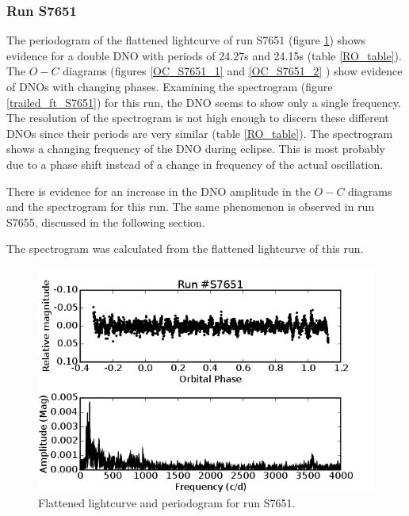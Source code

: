 \subsubsection{Run S7651}

The periodogram of the flattened lightcurve of run S7651 (figure \ref{S7651}) shows evidence for a double DNO with periods of 24.27s and 24.15s (table \ref{RO_table}). The $O-C$ diagrams (figures \ref{OC_S7651_1} and \ref{OC_S7651_2} ) show evidence of DNOs with changing phases. Examining the spectrogram (figure \ref{trailed_ft_S7651}) for this run, the DNO seems to show only a single frequency. The resolution of the spectrogram is not high enough to discern these different DNOs since their periods are very similar (table \ref{RO_table}). The spectrogram shows a changing frequency of the DNO during eclipse. This is most probably due to a phase shift instead of a change in frequency of the actual oscillation.

There is evidence for an increase in the DNO amplitude in the $O-C$ diagrams and the spectrogram for this run. The same phenomenon is observed in run S7655, discussed in the following section.

The spectrogram was calculated from the flattened lightcurve of this run.



\begin{figure}
 \centering
 \includegraphics[width = 0.8\columnwidth, bb=0 0 600 400]{images/S7651.png}
 \caption{Flattened lightcurve and periodogram for run S7651.}
 \label{S7651}
\end{figure}


